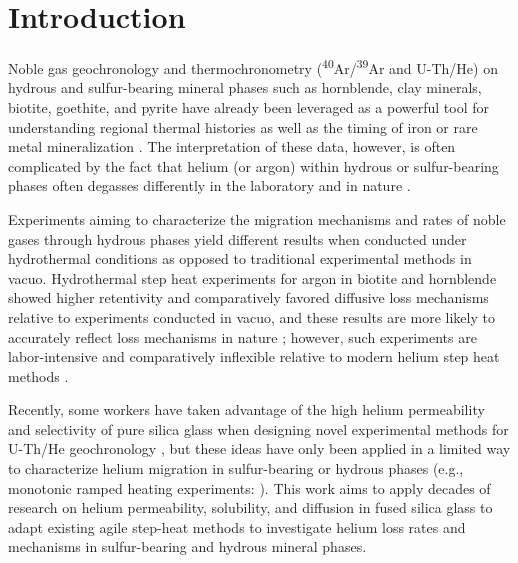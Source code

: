 
\providecommand{\tophline}{\toprule}
\providecommand{\middlehline}{\midrule}
\providecommand{\bottomhline}{\bottomrule}

\section{Introduction}

Noble gas geochronology and thermochronometry (\textsuperscript{40}Ar/\textsuperscript{39}Ar and U-Th/He) on hydrous and sulfur-bearing mineral phases such as hornblende, clay minerals, biotite, goethite, and pyrite have already been leveraged as a powerful tool for understanding regional thermal histories as well as the timing of iron or rare metal mineralization \citep{mcinnes2005,heim2006,vasconcelos2013,nomade2004,yakubovich2020,yakubovich2021}. The interpretation of these data, however, is often complicated by the fact that helium (or argon) within hydrous or sulfur-bearing phases often degasses differently in the laboratory and in nature \citep{hanson1975,lee1993,lo2000,farley2024}.

Experiments aiming to characterize the migration mechanisms and rates of noble gases through hydrous phases yield different results when conducted under hydrothermal conditions as opposed to traditional experimental methods in vacuo. Hydrothermal step heat experiments for argon in biotite and hornblende showed higher retentivity and comparatively favored diffusive loss mechanisms relative to experiments conducted in vacuo, and these results are more likely to accurately reflect loss mechanisms in nature \citep{harrison1982,harrison1985}; however, such experiments are labor-intensive and comparatively inflexible relative to modern helium step heat methods \citep{farley1999}.

Recently, some workers have taken advantage of the high helium permeability and selectivity of pure silica glass when designing novel experimental methods for U-Th/He geochronology \citep{yakubovich2020,yakubovich2021}, but these ideas have only been applied in a limited way to characterize helium migration in sulfur-bearing or hydrous phases (e.g., monotonic ramped heating experiments: \citealp{yakubovich2019}). This work aims to apply decades of research on helium permeability, solubility, and diffusion in fused silica glass \citep[e.g.,][]{jones1953,norton1953,rogers1954,altemose1961,swets1961,doremus1966,masaryk1968,shelby1971,shelby1972,shelby1976,shackelford1972} to adapt existing agile step-heat methods \citep{farley1999} to investigate helium loss rates and mechanisms in sulfur-bearing and hydrous mineral phases. 

